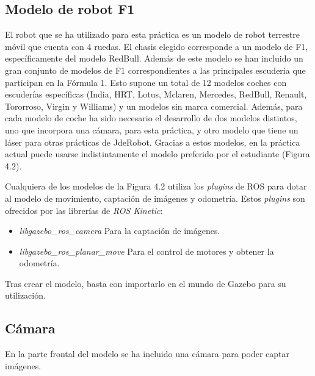 
\subsection{Modelo de robot F1}
El robot que se ha utilizado para esta práctica es un modelo de robot terrestre móvil que cuenta con 4 ruedas. El chasis elegido corresponde a un modelo de F1, específicamente del modelo RedBull. Además de este modelo se han incluido un gran conjunto de modelos de F1 correspondientes a las principales escudería que participan en la Fórmula 1. Esto supone un total de 12 modelos coches con escuderías específicas (India, HRT, Lotus, Mclaren, Mercedes, RedBull, Renault, Tororroso, Virgin y Williams) y un modelos sin marca comercial. Además, para cada modelo de coche ha sido necesario el desarrollo de dos modelos distintos, uno que incorpora una cámara, para esta práctica, y otro modelo que tiene un láser para otras prácticas de JdeRobot. Gracias a estos modelos, en la práctica actual puede usarse indistintamente el modelo preferido por el estudiante (Figura 4.2).



Cualquiera de los modelos de la Figura 4.2 utiliza los \textit{plugins} de ROS para dotar al modelo de movimiento, captación de imágenes y odometría. Estos \textit{plugins} son ofrecidos por las librerías de \textit{ROS Kinetic}:

\begin{itemize}
	\item \textit{libgazebo\_ros\_camera}
Para la captación de imágenes.
	\item \textit{libgazebo\_ros\_planar\_move}
Para el control de motores y obtener la odometría.
\end{itemize}

Tras crear el modelo, basta con importarlo en el mundo de Gazebo para su utilización.

\subsection{Cámara}
En la parte frontal del modelo se ha incluido una cámara para poder captar imágenes.

